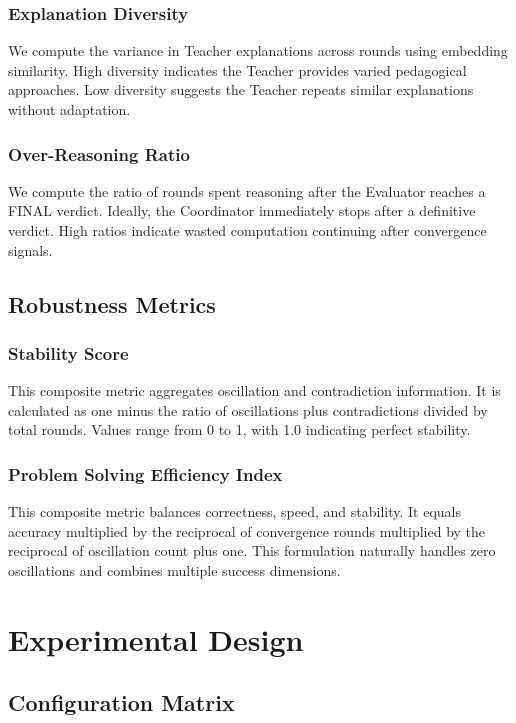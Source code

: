 \documentclass[conference]{IEEEtran}
\begin{document}
\subsubsection{Explanation Diversity}
We compute the variance in Teacher explanations across rounds using embedding similarity. High diversity indicates the Teacher provides varied pedagogical approaches. Low diversity suggests the Teacher repeats similar explanations without adaptation.

\subsubsection{Over-Reasoning Ratio}
We compute the ratio of rounds spent reasoning after the Evaluator reaches a FINAL verdict. Ideally, the Coordinator immediately stops after a definitive verdict. High ratios indicate wasted computation continuing after convergence signals.

\subsection{Robustness Metrics}

\subsubsection{Stability Score}
This composite metric aggregates oscillation and contradiction information. It is calculated as one minus the ratio of oscillations plus contradictions divided by total rounds. Values range from 0 to 1, with 1.0 indicating perfect stability.

\subsubsection{Problem Solving Efficiency Index}
This composite metric balances correctness, speed, and stability. It equals accuracy multiplied by the reciprocal of convergence rounds multiplied by the reciprocal of oscillation count plus one. This formulation naturally handles zero oscillations and combines multiple success dimensions.

\section{Experimental Design}

\subsection{Configuration Matrix}
\end{document}
